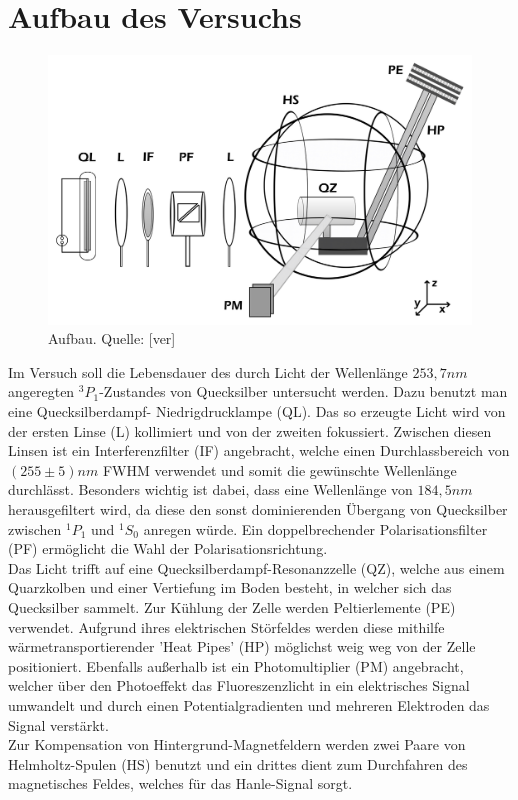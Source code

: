 \section{Aufbau des Versuchs}
\begin{figure}[h]
\includegraphics[scale=0.3]{Bilder/aufbau}
\caption{Aufbau. Quelle: [ver]}
\end{figure}
Im Versuch soll die Lebensdauer des durch Licht der Wellenlänge $253,7nm$ angeregten $^{3}P_{1}$-Zustandes von Quecksilber untersucht werden. Dazu benutzt man eine Quecksilberdampf- Niedrigdrucklampe (QL). Das so erzeugte Licht wird von der ersten Linse (L) kollimiert und von der zweiten fokussiert. Zwischen diesen Linsen ist ein Interferenzfilter (IF) angebracht, welche einen Durchlassbereich von $(255\pm5)nm$ FWHM  verwendet und somit die gewünschte Wellenlänge durchlässt. Besonders wichtig ist dabei, dass eine Wellenlänge von $184,5 nm$ herausgefiltert wird, da diese den sonst dominierenden Übergang von Quecksilber zwischen $^{1}P_{1}$ und $^{1}S_{0}$ anregen würde. Ein doppelbrechender Polarisationsfilter (PF) ermöglicht die Wahl der Polarisationsrichtung.\\
Das Licht trifft auf eine Quecksilberdampf-Resonanzzelle (QZ), welche aus einem Quarzkolben und einer Vertiefung im Boden besteht, in welcher sich das Quecksilber sammelt. Zur Kühlung der Zelle werden Peltierlemente (PE) verwendet. Aufgrund ihres elektrischen Störfeldes werden diese mithilfe wärmetransportierender 'Heat Pipes' (HP) möglichst weig weg von der Zelle positioniert. Ebenfalls außerhalb ist ein Photomultiplier (PM) angebracht, welcher über den Photoeffekt das Fluoreszenzlicht in ein elektrisches Signal umwandelt und durch einen Potentialgradienten und mehreren Elektroden das Signal verstärkt.\\
Zur Kompensation von Hintergrund-Magnetfeldern werden zwei Paare von Helmholtz-Spulen (HS) benutzt und ein drittes dient zum Durchfahren des magnetisches Feldes, welches für das Hanle-Signal sorgt.
